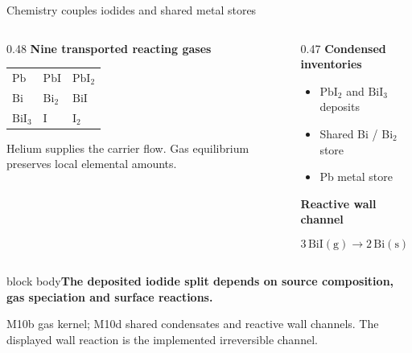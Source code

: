 \documentclass[aspectratio=169,10pt]{beamer}
\newcommand{\PbI}{\ensuremath{\mathrm{PbI}_2}}
\newcommand{\BiI}{\ensuremath{\mathrm{BiI}_3}}
\newcommand{\sources}[1]{\par\vfill{\raggedright\fontsize{6.2}{7.5}\selectfont\color{PSIgray}#1\par}}
\newcommand{\takeaway}[1]{\par\vspace{0.2em}\begin{beamercolorbox}[sep=0.4em,wd=\linewidth]{block body}{\small\textbf{#1}}\end{beamercolorbox}}
\begin{document}
\begin{frame}[t]{Chemistry couples iodides and shared metal stores}
  \begin{columns}[t,onlytextwidth]
    \begin{column}{0.48\textwidth}
      \textbf{Nine transported reacting gases}\par
      \vspace{0.6em}
      \begin{tabular}{@{}lll@{}}
        $\mathrm{Pb}$ & $\mathrm{PbI}$ & $\mathrm{PbI}_2$\\[0.6em]
        $\mathrm{Bi}$ & $\mathrm{Bi}_2$ & $\mathrm{BiI}$\\[0.6em]
        $\mathrm{BiI}_3$ & $\mathrm{I}$ & $\mathrm{I}_2$
      \end{tabular}
      \vspace{0.8em}\par
      \small Helium supplies the carrier flow. Gas equilibrium preserves local elemental amounts.
    \end{column}
    \begin{column}{0.47\textwidth}
      \textbf{Condensed inventories}\par
      \begin{itemize}
        \item \PbI{} and \BiI{} deposits
        \item Shared Bi / Bi$_2$ store
        \item Pb metal store
      \end{itemize}
      \vspace{0.5em}
      \textbf{Reactive wall channel}\par
      \[
        3\,\mathrm{BiI(g)}\longrightarrow
        2\,\mathrm{Bi(s)}+\mathrm{BiI}_3\mathrm{(g)}
      \]
    \end{column}
  \end{columns}
  \takeaway{The deposited iodide split depends on source composition, gas speciation and surface reactions.}
  \sources{M10b gas kernel; M10d shared condensates and reactive wall channels. The displayed wall reaction is the implemented irreversible channel.}
\end{frame}
\end{document}
